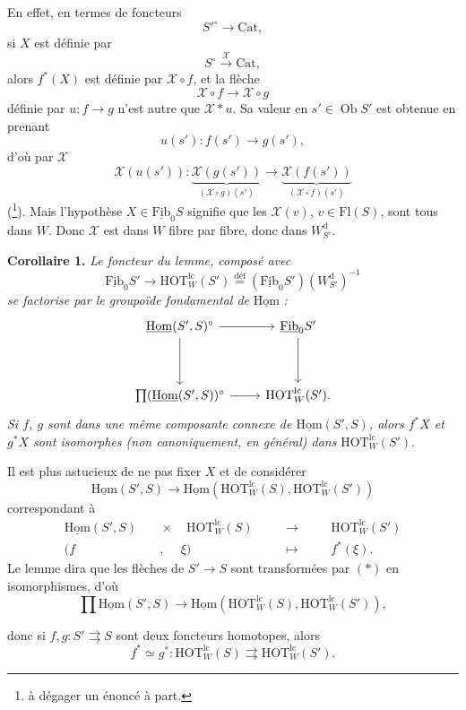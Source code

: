 \documentclass[11pt]{article}
\newcommand{\printedpage}[1]{\marginpar{\footnotesize p.~#1}}
\newcommand{\msp}[1]{\marginpar{\footnotesize [#1]}}
\newcommand{\Cat}{\mathrm{Cat}}
\newcommand{\Ob}{\operatorname{Ob}}
\newcommand{\fl}{\longrightarrow}
\newcommand{\uHom}{\underline{\mathrm{Hom}}}
\newcommand{\uFib}{\underline{\mathrm{Fib}}}
\newcommand{\HOT}{\mathrm{HOT}}
\newcommand{\HOTlc}{\mathrm{HOT}^{\mathrm{lc}}_W}
\begin{document}
\printedpage{33}
En effet, en termes de foncteurs
\[ S'^{\circ}\fl\Cat, \]
si $X$ est définie par
\[ S^{\circ}\xrightarrow{\ \mathscr{X}\ }\Cat, \]
alors $f^*(X)$ est définie par $\mathscr{X}\circ f$, et la flèche
\[ \mathscr{X}\circ f\fl\mathscr{X}\circ g \]
définie par $u : f\fl g$ n'est autre que $\mathscr{X}*u$. Sa valeur en $s'\in\Ob S'$ est obtenue en prenant
\[ u(s') : f(s')\fl g(s'), \]
d'où par $\mathscr{X}$
\[ \mathscr{X}(u(s')) : \underbrace{\mathscr{X}(g(s'))}_{(\mathscr{X}\circ g)(s')}\fl\underbrace{\mathscr{X}(f(s'))}_{(\mathscr{X}\circ f)(s')} \]
(\footnote[53]{à dégager un énoncé à part.}). Mais l'hypothèse $X\in\uFib_0S$ signifie que les $\mathscr{X}(v)$, $v\in\mathrm{Fl}(S)$, sont tous dans $W$. Donc
\msp{page 45}$\mathscr{X}$ est dans $W$ fibre par fibre, donc dans $W^{\mathrm{d}}_{S'}$.

\textbf{Corollaire 1.} \textit{Le foncteur du lemme, composé avec}
\[ \uFib_0S'\fl\HOT^{\mathrm{lc}}_W(S')\overset{\text{déf}}{=}(\uFib_0S')(W^{\mathrm{d}}_{S'})^{-1} \]
\textit{se factorise par le groupoïde fondamental de} $\uHom$ \textit{:}
\[
\begin{tikzcd}[row sep=huge]
\uHom(S',S)^{\circ} \arrow[r] \arrow[d] & \uFib_0S' \arrow[d] \\
\textstyle\prod(\uHom(S',S))^{\circ} \arrow[r] & \HOT^{\mathrm{lc}}_W(S').
\end{tikzcd}
\]
\textit{Si $f$, $g$ sont dans une même composante connexe de $\uHom(S',S)$, alors $f^*X$ et $g^*X$ sont isomorphes (non canoniquement, en général) dans} $\HOT^{\mathrm{lc}}_W(S')$.

Il est plus astucieux de ne pas fixer $X$ et de considérer
\[ \uHom(S',S)\fl\uHom(\HOT^{\mathrm{lc}}_W(S),\HOT^{\mathrm{lc}}_W(S')) \tag*{$(*)$} \]
correspondant à
\[
\begin{aligned}
\uHom(S',S) &\quad\times\quad \HOT^{\mathrm{lc}}_W(S) &&\quad\longrightarrow\quad &&\HOT^{\mathrm{lc}}_W(S')\\
(f &\quad,\quad\ \xi) &&\quad\longmapsto\quad && f^*(\xi).
\end{aligned}
\]
Le lemme dira que les flèches de $S'\fl S$ sont transformées par $(*)$ en isomorphismes, d'où
\[ \prod\uHom(S',S)\fl\uHom(\HOT^{\mathrm{lc}}_W(S),\HOT^{\mathrm{lc}}_W(S')), \]

\printedpage{34}

\msp{page 46}
donc si $f,g : S' \rightrightarrows S$ sont deux foncteurs homotopes, alors
\[ f^* \simeq g^* : \HOTlc(S) \rightrightarrows \HOTlc(S'). \]
\end{document}
